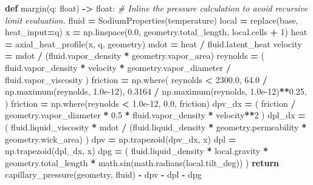 \documentclass[
  12pt,a4paper,oneside]{report}
\newenvironment{Shaded}{\begin{snugshade}}{\end{snugshade}}
\newcommand{\BuiltInTok}[1]{#1}
\newcommand{\CommentTok}[1]{\textcolor[rgb]{0.56,0.35,0.01}{\textit{#1}}}
\newcommand{\ControlFlowTok}[1]{\textcolor[rgb]{0.13,0.29,0.53}{\textbf{#1}}}
\newcommand{\DecValTok}[1]{\textcolor[rgb]{0.00,0.00,0.81}{#1}}
\newcommand{\FloatTok}[1]{\textcolor[rgb]{0.00,0.00,0.81}{#1}}
\newcommand{\KeywordTok}[1]{\textcolor[rgb]{0.13,0.29,0.53}{\textbf{#1}}}
\newcommand{\NormalTok}[1]{#1}
\newcommand{\OperatorTok}[1]{\textcolor[rgb]{0.81,0.36,0.00}{\textbf{#1}}}
\begin{document}
\begin{Shaded}
\begin{Highlighting}[]
    \KeywordTok{def}\NormalTok{ margin(q: }\BuiltInTok{float}\NormalTok{) }\OperatorTok{{-}\textgreater{}} \BuiltInTok{float}\NormalTok{:}
        \CommentTok{\# Inline the pressure calculation to avoid recursive limit evaluation.}
\NormalTok{        fluid }\OperatorTok{=}\NormalTok{ SodiumProperties(temperature)}
\NormalTok{        local }\OperatorTok{=}\NormalTok{ replace(base, heat\_input}\OperatorTok{=}\NormalTok{q)}
\NormalTok{        x }\OperatorTok{=}\NormalTok{ np.linspace(}\FloatTok{0.0}\NormalTok{, geometry.total\_length, local.cells }\OperatorTok{+} \DecValTok{1}\NormalTok{)}
\NormalTok{        heat }\OperatorTok{=}\NormalTok{ axial\_heat\_profile(x, q, geometry)}
\NormalTok{        mdot }\OperatorTok{=}\NormalTok{ heat }\OperatorTok{/}\NormalTok{ fluid.latent\_heat}
\NormalTok{        velocity }\OperatorTok{=}\NormalTok{ mdot }\OperatorTok{/}\NormalTok{ (fluid.vapor\_density }\OperatorTok{*}\NormalTok{ geometry.vapor\_area)}
\NormalTok{        reynolds }\OperatorTok{=}\NormalTok{ (}
\NormalTok{            fluid.vapor\_density }\OperatorTok{*}\NormalTok{ velocity }\OperatorTok{*}\NormalTok{ geometry.vapor\_diameter}
            \OperatorTok{/}\NormalTok{ fluid.vapor\_viscosity}
\NormalTok{        )}
\NormalTok{        friction }\OperatorTok{=}\NormalTok{ np.where(}
\NormalTok{            reynolds }\OperatorTok{\textless{}} \FloatTok{2300.0}\NormalTok{,}
            \FloatTok{64.0} \OperatorTok{/}\NormalTok{ np.maximum(reynolds, }\FloatTok{1.0e{-}12}\NormalTok{),}
            \FloatTok{0.3164} \OperatorTok{/}\NormalTok{ np.maximum(reynolds, }\FloatTok{1.0e{-}12}\NormalTok{)}\OperatorTok{**}\FloatTok{0.25}\NormalTok{,}
\NormalTok{        )}
\NormalTok{        friction }\OperatorTok{=}\NormalTok{ np.where(reynolds }\OperatorTok{\textless{}} \FloatTok{1.0e{-}12}\NormalTok{, }\FloatTok{0.0}\NormalTok{, friction)}
\NormalTok{        dpv\_dx }\OperatorTok{=}\NormalTok{ (}
\NormalTok{            friction }\OperatorTok{/}\NormalTok{ geometry.vapor\_diameter}
            \OperatorTok{*} \FloatTok{0.5} \OperatorTok{*}\NormalTok{ fluid.vapor\_density }\OperatorTok{*}\NormalTok{ velocity}\OperatorTok{**}\DecValTok{2}
\NormalTok{        )}
\NormalTok{        dpl\_dx }\OperatorTok{=}\NormalTok{ (}
\NormalTok{            fluid.liquid\_viscosity }\OperatorTok{*}\NormalTok{ mdot}
            \OperatorTok{/}\NormalTok{ (fluid.liquid\_density }\OperatorTok{*}\NormalTok{ geometry.permeability }\OperatorTok{*}\NormalTok{ geometry.wick\_area)}
\NormalTok{        )}
\NormalTok{        dpv }\OperatorTok{=}\NormalTok{ np.trapezoid(dpv\_dx, x)}
\NormalTok{        dpl }\OperatorTok{=}\NormalTok{ np.trapezoid(dpl\_dx, x)}
\NormalTok{        dpg }\OperatorTok{=}\NormalTok{ (}
\NormalTok{            fluid.liquid\_density }\OperatorTok{*}\NormalTok{ local.gravity }\OperatorTok{*}\NormalTok{ geometry.total\_length}
            \OperatorTok{*}\NormalTok{ math.sin(math.radians(local.tilt\_deg))}
\NormalTok{        )}
        \ControlFlowTok{return}\NormalTok{ capillary\_pressure(geometry, fluid) }\OperatorTok{{-}}\NormalTok{ dpv }\OperatorTok{{-}}\NormalTok{ dpl }\OperatorTok{{-}}\NormalTok{ dpg}


\end{Highlighting}
\end{Shaded}
\end{document}
